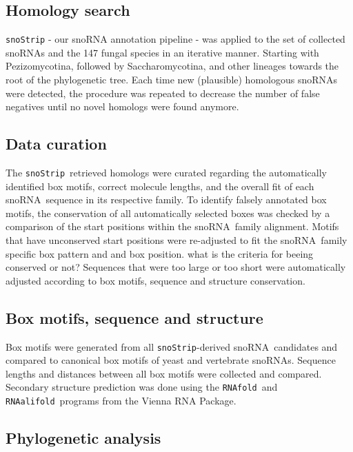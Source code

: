 \documentclass[preprint,3p,times,twocolumn]{elsarticle}
\newcommand{\JH}[1]{\begingroup\color{purple}#1\endgroup}
\newcommand{\SB}[1]{\begingroup\color{turquoise}#1\endgroup}
\newcommand{\sno}{snoRNA}
\newcommand{\snostrip}{\texttt{snoStrip}}
\newcommand{\fold}{\texttt{RNAfold}}
\newcommand{\alifold}{\texttt{RNAalifold}}
\begin{document}
\subsection{Homology search}

\snostrip \citep{Bartschat:2014} - our snoRNA annotation pipeline - was
applied to the set of collected snoRNAs and the 147 fungal species in
an iterative manner. Starting with Pezizomycotina, followed by
Saccharomycotina, and other lineages towards the root of the
phylogenetic tree. Each time new (plausible) homologous snoRNAs were
detected, the procedure was repeated to decrease the number of false
negatives until no novel homologs were found anymore.

\subsection{Data curation}

The \snostrip\ retrieved homologs were curated regarding the
automatically identified box motifs, correct molecule lengths, and the
overall fit of each \sno\ sequence in its respective family.  To
identify falsely annotated box motifs, the conservation of all
automatically selected boxes was checked by a comparison of the start
positions within the \sno\ family alignment. Motifs that have \SB{unconserved} start
positions were re-adjusted to fit the \sno\ family specific box pattern and and box position.
\JH{what is the criteria for beeing
  conserved or not?} 
Sequences that were too large or too short were automatically adjusted according to box
motifs, sequence and structure conservation. 

\subsection{Box motifs, sequence and structure}

Box motifs were generated from all \snostrip-derived \sno\ candidates
and compared to canonical box motifs of yeast and vertebrate snoRNAs.
Sequence lengths and distances between all box motifs were collected
and compared. Secondary structure prediction was done using the \fold\
and \alifold\ programs from the Vienna RNA
Package\cite{Hofacker:1994}.

\subsection{Phylogenetic analysis}
\end{document}

